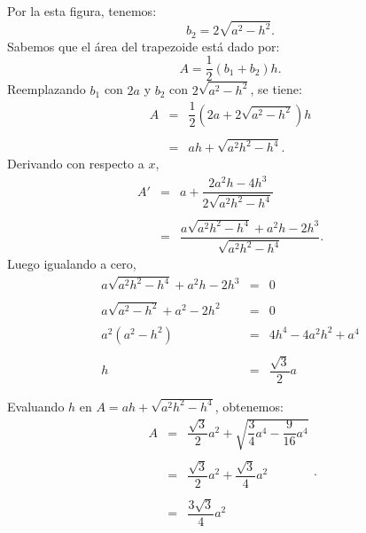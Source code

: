 \begin{enumerate}[\bfseries 1.]
	Por la esta figura, tenemos:
	$$b_2=2\sqrt{a^2-h^2}.$$
	Sabemos que el área del trapezoide está dado por:
	$$A=\dfrac{1}{2}(b_1+b_2)h.$$
	Reemplazando $b_1$ con $2a$ y $b_2$ con $2\sqrt{a^2-h^2}$, se tiene:
	$$\begin{array}{rcl}
	    A&=&\dfrac{1}{2}\left(2a+2\sqrt{a^2-h^2}\right)h\\\\
	     &=&ah+\sqrt{a^2h^2-h^4}.
	\end{array}$$
	Derivando con respecto a $x$,
	$$\begin{array}{rcl}
	    A'&=&a+\dfrac{2a^2h-4h^3}{2\sqrt{a^2h^2-h^4}}\\\\
	      &=&\dfrac{a\sqrt{a^2h^2-h^4}+a^2h-2h^3}{\sqrt{a^2h^2-h^4}}.
	\end{array}$$
	Luego igualando a cero,
	$$\begin{array}{rcl}
	    a\sqrt{a^2h^2-h^4}+a^2h-2h^3&=&0\\\\
	    a\sqrt{a^2-h^2}+a^2-2h^2&=&0\\\\
	    a^2\left(a^2-h^2\right) &=& 4h^4-4a^2h^2+a^4\\\\
	    h&=&\dfrac{\sqrt{3}}{2}a
	\end{array}$$

	Evaluando $h$ en $A=ah+\sqrt{a^2h^2-h^4}$, obtenemos:
	$$\begin{array}{rcl}
	    A&=&\dfrac{\sqrt{3}}{2}a^2+\sqrt{\dfrac{3}{4}a^4-\dfrac{9}{16}a^4}\\\\
	     &=&\dfrac{\sqrt{3}}{2}a^2+\dfrac{\sqrt{3}}{4}a^2\\\\
	     &=&\dfrac{3\sqrt{3}}{4}a^2
	\end{array}.$$
	\vspace{.5cm}


\end{enumerate}
